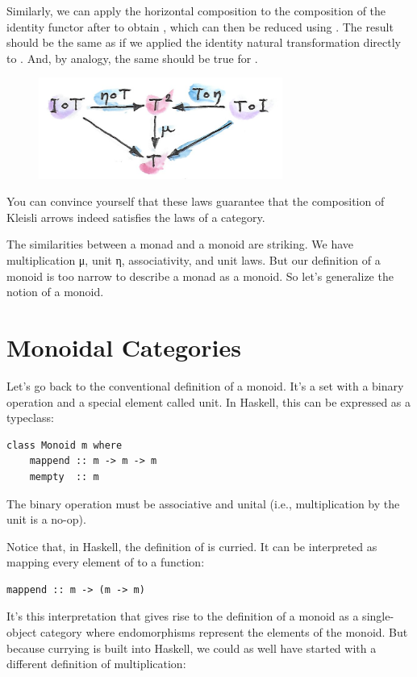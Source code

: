 \noindent
Similarly, we can apply the horizontal composition  to the
composition of the identity functor  after  to
obtain , which can then be reduced using . The
result should be the same as if we applied the identity natural
transformation directly to . And, by analogy, the same should
be true for .

\begin{figure}[H]
\centering
\includegraphics[width=80mm]{images/unitlawcomp-1.png}
\end{figure}

\noindent
You can convince yourself that these laws guarantee that the composition
of Kleisli arrows indeed satisfies the laws of a category.

The similarities between a monad and a monoid are striking. We have
multiplication μ, unit η, associativity, and unit laws. But our
definition of a monoid is too narrow to describe a monad as a monoid. So
let's generalize the notion of a monoid.

\section{Monoidal Categories}\label{monoidal-categories}

Let's go back to the conventional definition of a monoid. It's a set
with a binary operation and a special element called unit. In Haskell,
this can be expressed as a typeclass:

\begin{Verbatim}[commandchars=\\\{\}]
class Monoid m where
    mappend :: m -> m -> m
    mempty  :: m
\end{Verbatim}
The binary operation  must be associative and unital
(i.e., multiplication by the unit  is a no-op).

Notice that, in Haskell, the definition of  is curried.
It can be interpreted as mapping every element of  to a
function:

\begin{Verbatim}[commandchars=\\\{\}]
mappend :: m -> (m -> m)
\end{Verbatim}
It's this interpretation that gives rise to the definition of a monoid
as a single-object category where endomorphisms
 represent the elements of the monoid.
But because currying is built into Haskell, we could as well have
started with a different definition of multiplication:

